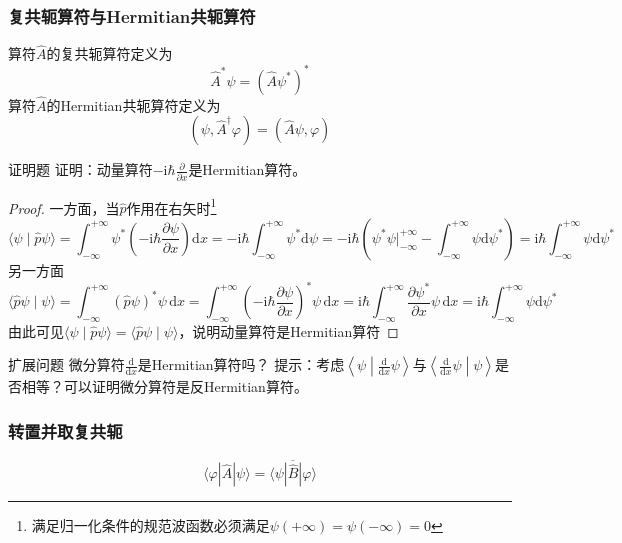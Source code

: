 \subsubsection{复共轭算符与Hermitian共轭算符}
算符$\hat{A}$的复共轭算符定义为
\begin{equation}
    \hat{A}^*\psi = \left(\hat{A}\psi^*\right)^*
\end{equation}
算符$\hat{A}$的Hermitian共轭算符定义为
\begin{equation}
    \left(\psi, \hat{A}^{\dagger}\varphi\right) = \left(\hat{A}\psi, \varphi\right)
\end{equation}
\begin{question}{证明题}
    证明：动量算符$-\mathrm{i}\hbar\frac{\partial}{\partial x}$是Hermitian算符。
\end{question}
\begin{proof}
    一方面，当$\hat{p}$作用在右矢时\footnote{满足归一化条件的规范波函数必须满足$\psi(+\infty)=\psi(-\infty)=0$}
    $$
        \langle \psi\mid\hat{p}\psi \rangle
        = \int_{-\infty}^{+\infty}\psi^*\left(-\mathrm{i}\hbar\frac{\partial \psi}{\partial x}\right)\mathrm{d}x
        =-\mathrm{i}\hbar\int_{-\infty}^{+\infty}\psi^*\mathrm{d}\psi
        =-\mathrm{i}\hbar\left(\psi^*\psi\Big|_{-\infty}^{+\infty} - \int_{-\infty}^{+\infty}\psi\mathrm{d}\psi^*\right)
        =\mathrm{i}\hbar\int_{-\infty}^{+\infty}\psi\mathrm{d}\psi^*
    $$
    另一方面
    $$
        \langle \hat{p}\psi\mid\psi \rangle
        =\int_{-\infty}^{+\infty}\left(\hat{p}\psi\right)^*\psi\,\mathrm{d}x
        =\int_{-\infty}^{+\infty}\left(-\mathrm{i}\hbar\frac{\partial \psi}{\partial x}\right)^*\psi\,\mathrm{d}x
        =\mathrm{i}\hbar\int_{-\infty}^{+\infty}\frac{\partial \psi^*}{\partial x}\psi\,\mathrm{d}x
        =\mathrm{i}\hbar\int_{-\infty}^{+\infty}\psi\mathrm{d}\psi^*
    $$
    由此可见$\langle \psi\mid\hat{p}\psi \rangle=\langle \hat{p}\psi\mid\psi \rangle$，说明动量算符是Hermitian算符
\end{proof}
\begin{question}{扩展问题}
    微分算符$\frac{\mathrm{d}}{\mathrm{d}x}$是Hermitian算符吗？
    \tcblower
    提示：考虑$\left\langle \psi \middle| \frac{\mathrm{d}}{\mathrm{d}x}\psi\right\rangle$与$\left\langle \frac{\mathrm{d}}{\mathrm{d}x}\psi \middle| \psi\right\rangle$是否相等？可以证明微分算符是反Hermitian算符。
\end{question}

\subsubsection{转置并取复共轭}
$$
    \langle\varphi|\hat{A}|\psi\rangle=\overline{\langle\psi|\hat{B}|\varphi\rangle}
$$

